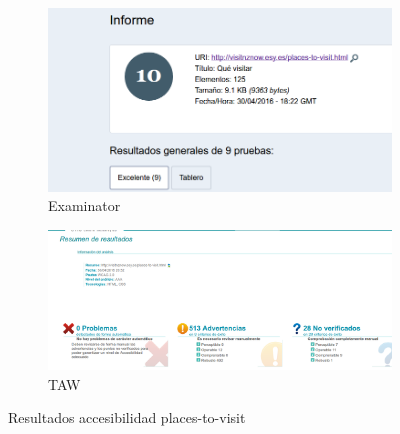 		\begin{figure}
			\centering
			\begin{subfigure}{.5\textwidth}
				\centering
				\includegraphics[width=.8\linewidth]{./Fotos/exa-visit.png}
				\caption{Examinator}
				\label{fig: Examinator places-to-visit}
			\end{subfigure}%
			\begin{subfigure}{.5\textwidth}
				\centering
				\includegraphics[width=.8\linewidth]{./Fotos/taw-visit.png}
				\caption{TAW}
				\label{fig: TAW places-to-visit}
			\end{subfigure}
			\caption{Resultados accesibilidad places-to-visit}
			\label{fig: Resultados accesibilidad places-to-visit}
		\end{figure}


